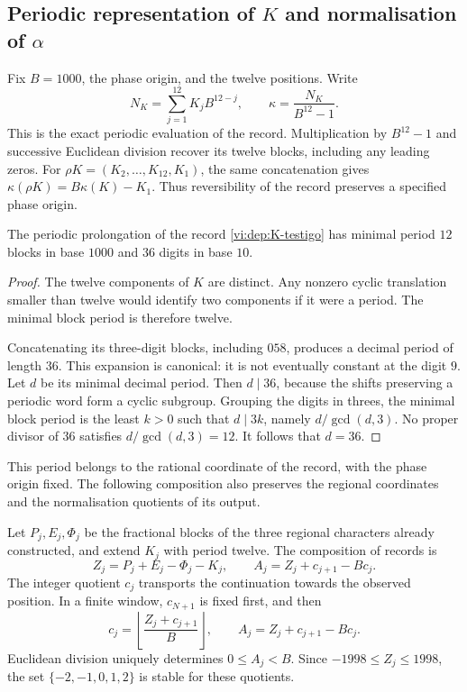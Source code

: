 \subsection{\texorpdfstring{Periodic representation of \(K\) and normalisation of \(\alpha\)}{Periodic representation of K and normalisation of alpha}}
\label{vi:dep:alpha}

Fix \(B=1000\), the phase origin, and the twelve positions. Write
\[
 N_K=\sum_{j=1}^{12}K_jB^{12-j},\qquad
 \kappa=\frac{N_K}{B^{12}-1}.
\]
This is the exact periodic evaluation of the record. Multiplication
by \(B^{12}-1\) and successive Euclidean division recover its twelve
blocks, including any leading zeros. For
\(\rho K=(K_2,\ldots,K_{12},K_1)\), the same concatenation gives
\(\kappa(\rho K)=B\kappa(K)-K_1\). Thus reversibility
of the record preserves a specified phase origin.

\begin{proposition}
\label{vi:dep:periodo-minimo-k}
The periodic prolongation of the record \eqref{vi:dep:K-testigo}
has minimal period \(12\) blocks in base \(1000\) and
\(36\) digits in base \(10\).
\end{proposition}
\begin{proof}
The twelve components of \(K\) are distinct. Any nonzero cyclic
translation smaller than twelve would identify two components if it were
a period. The minimal block period is therefore twelve.

Concatenating its three-digit blocks, including \(058\),
produces a decimal period of length \(36\). This expansion is
canonical: it is not eventually constant at the digit \(9\).
Let \(d\) be its minimal decimal period. Then \(d\mid36\),
because the shifts preserving a periodic word form
a cyclic subgroup. Grouping the digits in threes, the minimal
block period is the least \(k>0\) such that \(d\mid3k\), namely
\(d/\gcd(d,3)\). No proper divisor of \(36\)
satisfies \(d/\gcd(d,3)=12\). It follows that \(d=36\).
\end{proof}

This period belongs to the rational coordinate of the record, with the
phase origin fixed. The following composition also preserves the
regional coordinates and the normalisation quotients of its output.

Let \(P_j,E_j,\Phi_j\) be the fractional blocks of the three
regional characters already constructed, and extend \(K_j\) with period
twelve. The composition of records is
\begin{equation}
 Z_j=P_j+E_j-\Phi_j-K_j,
 \qquad
 A_j=Z_j+c_{j+1}-Bc_j.
 \label{vi:dep:normalizacion-alpha}
\end{equation}
The integer quotient \(c_j\) transports the continuation towards the observed
position. In a finite window, \(c_{N+1}\) is fixed first, and then
\[
 c_j=\left\lfloor\frac{Z_j+c_{j+1}}B\right\rfloor,
 \qquad A_j=Z_j+c_{j+1}-Bc_j.
\]
Euclidean division uniquely determines \(0\le A_j<B\).
Since \(-1998\le Z_j\le1998\), the set
\(\{-2,-1,0,1,2\}\) is stable for these quotients.

